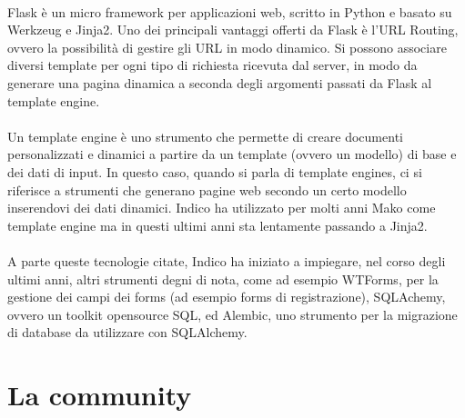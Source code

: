 		\\
		Flask è un micro framework per applicazioni web, scritto in Python e basato su Werkzeug e Jinja2. Uno dei principali vantaggi offerti da Flask è l'URL Routing, ovvero la  possibilità di gestire gli URL in modo dinamico. Si possono associare diversi template per ogni tipo di richiesta ricevuta dal server, in modo da generare una pagina dinamica a seconda degli argomenti passati da Flask al template engine. \cite{indico:flask}\\
		\\
		Un template engine è uno strumento che permette di creare documenti personalizzati e dinamici a partire da un template (ovvero un modello) di base e dei dati di input. In questo caso, quando si parla di template engines, ci si riferisce a strumenti che generano pagine web secondo un certo modello inserendovi dei dati dinamici. Indico ha utilizzato per molti anni Mako come template engine ma in questi ultimi anni sta lentamente passando a Jinja2. \cite{indico:template_engines}\\
		\\
		A parte queste tecnologie citate, Indico ha iniziato a impiegare, nel corso degli ultimi anni, altri strumenti degni di nota, come  ad esempio WTForms, per la gestione dei campi dei forms (ad esempio forms di registrazione), SQLAchemy, ovvero un toolkit opensource SQL, ed Alembic, uno strumento per la migrazione di database da utilizzare con SQLAlchemy.
		
	\section{La community} \label{sec:indico;community}
	
